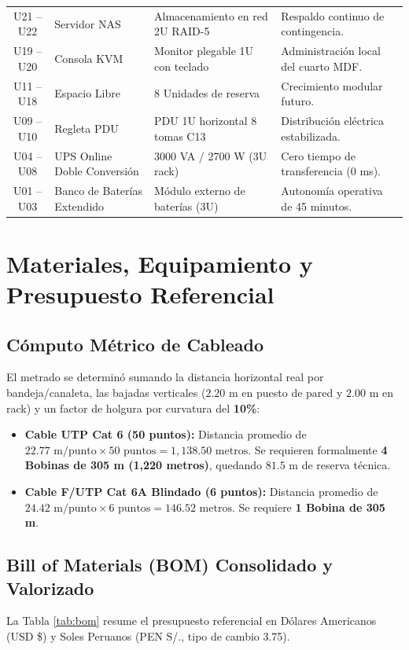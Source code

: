 \documentclass[11pt,a4paper]{article}
\begin{document}
\begin{table}[h!]
\begin{tabularx}{\textwidth}{c l p{5.5cm} X}
U21 -- U22 & Servidor NAS & Almacenamiento en red 2U RAID-5 & Respaldo continuo de contingencia. \\
U19 -- U20 & Consola KVM & Monitor plegable 1U con teclado & Administración local del cuarto MDF. \\
U11 -- U18 & Espacio Libre & 8 Unidades de reserva & Crecimiento modular futuro. \\
U09 -- U10 & Regleta PDU & PDU 1U horizontal 8 tomas C13 & Distribución eléctrica estabilizada. \\
U04 -- U08 & UPS Online Doble Conversión & 3000 VA / 2700 W (3U rack) & Cero tiempo de transferencia (0 ms). \\
U01 -- U03 & Banco de Baterías Extendido & Módulo externo de baterías (3U) & Autonomía operativa de 45 minutos. \\
\bottomrule
\end{tabularx}
\end{table}

\section{Materiales, Equipamiento y Presupuesto Referencial}

\subsection{Cómputo Métrico de Cableado}
El metrado se determinó sumando la distancia horizontal real por bandeja/canaleta, las bajadas verticales ($2.20\text{ m}$ en puesto de pared y $2.00\text{ m}$ en rack) y un factor de holgura por curvatura del \textbf{10\%}:
\begin{itemize}[noitemsep]
    \item \textbf{Cable UTP Cat 6 (50 puntos):} Distancia promedio de $22.77\text{ m/punto} \times 50\text{ puntos} = 1,138.50\text{ metros}$. Se requieren formalmente \textbf{4 Bobinas de 305 m (1,220 metros)}, quedando $81.5\text{ m}$ de reserva técnica.
    \item \textbf{Cable F/UTP Cat 6A Blindado (6 puntos):} Distancia promedio de $24.42\text{ m/punto} \times 6\text{ puntos} = 146.52\text{ metros}$. Se requiere \textbf{1 Bobina de 305 m}.
\end{itemize}

\subsection{Bill of Materials (BOM) Consolidado y Valorizado}
La Tabla \ref{tab:bom} resume el presupuesto referencial en Dólares Americanos (USD \$) y Soles Peruanos (PEN S/., tipo de cambio 3.75).
\end{document}
